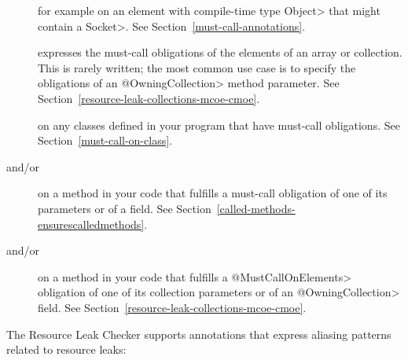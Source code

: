 \begin{description}

\item[]
for example on an element with compile-time type \<Object> that might contain a \<Socket>.
See Section~\ref{must-call-annotations}.

\item[]
expresses the must-call obligations of the elements of an array or
collection. This is rarely written; the most common use case is to specify the
obligations of an \<@OwningCollection> method parameter. See
Section~\ref{resource-leak-collections-mcoe-cmoe}.

\item[]
on any classes defined in your program that have must-call obligations. See Section~\ref{must-call-on-class}.

\item[ and/or
      ]
on a method in your code that fulfills a must-call obligation of one of its parameters or of a field.
See Section~\ref{called-methods-ensurescalledmethods}.

\item[ and/or
      ]
on a method in your code that fulfills a \<@MustCallOnElements> obligation of
one of its collection parameters or of an \<@OwningCollection> field. See
Section~\ref{resource-leak-collections-mcoe-cmoe}.

\end{description}

The Resource Leak Checker supports annotations that express
aliasing patterns related to resource leaks:

